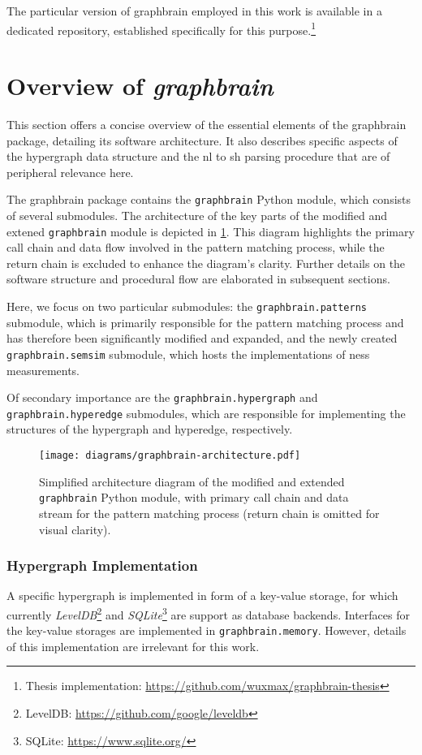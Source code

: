 \documentclass[11pt, numbers=noenddot]{scrreprt}
\begin{document}
The particular version of graphbrain employed in this work is available in a dedicated repository, established specifically for this purpose.\footnote{Thesis implementation: \url{https://github.com/wuxmax/graphbrain-thesis}}


\section{Overview of \textit{graphbrain}}
This section offers a concise overview of the essential elements of the graphbrain package, detailing its software architecture. It also describes specific aspects of the hypergraph data structure and the \gls{nl} to \gls{sh} parsing procedure that are of peripheral relevance here.

The graphbrain package contains the \texttt{graphbrain} Python module, which consists of several submodules. The architecture of the key parts of the modified and extened \texttt{graphbrain} module is depicted in \cref{fig:graphbrain-architecture}. This diagram highlights the primary call chain and data flow involved in the pattern matching process, while the return chain is excluded to enhance the diagram's clarity. Further details on the software structure and procedural flow are elaborated in subsequent sections.

Here, we focus on two particular submodules: the \texttt{graphbrain.patterns} submodule, which is primarily responsible for the pattern matching process and has therefore been significantly modified and expanded, and the newly created \texttt{graphbrain.semsim} submodule, which hosts the implementations of \gls{ness} measurements. 

Of secondary importance are the \texttt{graphbrain.hypergraph} and \texttt{graphbrain.hyperedge} submodules, which are responsible for implementing the structures of the hypergraph and hyperedge, respectively.

\begin{figure}
\centering
\texttt{[image: diagrams/graphbrain-architecture.pdf]}
\caption{Simplified architecture diagram of the modified and extended \texttt{graphbrain} Python module, with primary call chain and data stream for the pattern matching process (return chain is omitted for visual clarity).}
\label{fig:graphbrain-architecture}
\end{figure}


\subsubsection{Hypergraph Implementation}
A specific hypergraph is implemented in form of a key-value storage, for which currently \textit{LevelDB}\footnote{LevelDB: \url{https://github.com/google/leveldb}} and \textit{SQLite}\footnote{SQLite: \url{https://www.sqlite.org/}} are support as database backends. Interfaces for the key-value storages are implemented in \texttt{graphbrain.memory}. However, details of this implementation are irrelevant for this work.
\end{document}

